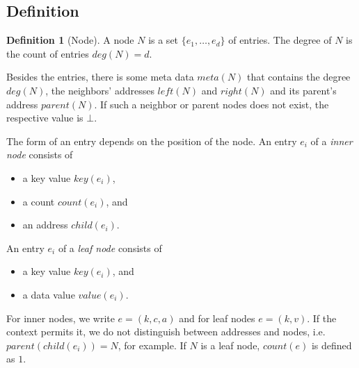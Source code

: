 \documentclass[a4paper, 8pt]{scrartcl}
\theoremstyle{plain}
\theoremstyle{definition}
\newtheorem{defi}[thm]{Definition}
\theoremstyle{remark}
\begin{document}
\begin{multicols}{2}


\section{Definition} %

\begin{defi}[Node]
A node $N$ is a set \mbox{$\{ e_1, \ldots, e_d \}$} of entries. 
The degree of $N$ is the count of entries \mbox{$deg(N) = d$}.

Besides the entries, there is some meta data $meta(N)$ that contains the
degree $deg(N)$, the neighbors' addresses $left(N)$ and $right(N)$ and its
parent's address $parent(N)$.
If such a neighbor or parent nodes does not exist, the respective value is
$\bot$.

The form of an entry depends on the position of the node.
An entry $e_i$ of a {\em inner node} consists of
\begin{itemize}
\item a key value $key(e_i)$,
\item a count $count(e_i)$, and
\item an address $child(e_i)$.
\end{itemize}
An entry $e_i$ of a {\em leaf node} consists of
\begin{itemize}
\item a key value $key(e_i)$, and
\item a data value $value(e_i)$.
\end{itemize}
For inner nodes, we write \mbox{$e = (k, c, a)$} and for leaf nodes 
\mbox{$e = (k, v)$}.
If the context permits it, we do not distinguish between addresses and nodes,
i.e. \mbox{$parent(child(e_i)) = N$}, for example.
If $N$ is a leaf node, $count(e)$ is defined as $1$.
\end{defi}


\end{multicols}
\end{document}
